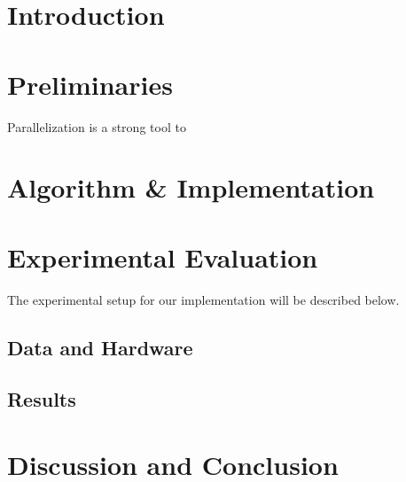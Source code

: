 \documentclass[twocolumn]{article}
\begin{document}


\begin{abstract}
    
\end{abstract}


\section{Introduction}


\section{Preliminaries}
Parallelization is a strong tool to 

\section{Algorithm \& Implementation}



\section{Experimental Evaluation}
The experimental setup for our implementation will be described below.

\subsection{Data and Hardware}%
\label{sub:Data and Hardware}


\subsection{Results}%
\label{sub:Results}

\newpage
\section{Discussion and Conclusion}
\end{document}

